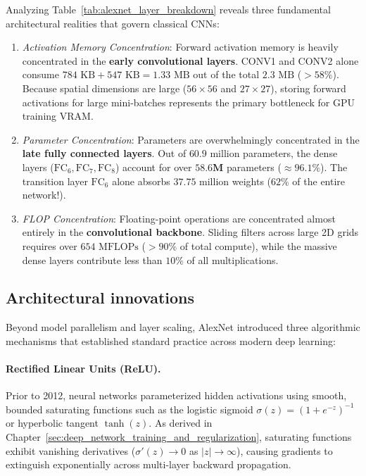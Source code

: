 Analyzing Table~\ref{tab:alexnet_layer_breakdown} reveals three fundamental architectural realities that govern classical CNNs:
\begin{enumerate}[leftmargin=*]
  \item \textit{Activation Memory Concentration}: Forward activation memory is heavily concentrated in the \textbf{early convolutional layers}. CONV1 and CONV2 alone consume $784\text{ KB} + 547\text{ KB} = 1.33\text{ MB}$ out of the total $2.3\text{ MB}$ ($>58\%$). Because spatial dimensions are large ($56 \times 56$ and $27 \times 27$), storing forward activations for large mini-batches represents the primary bottleneck for GPU training VRAM.
  \item \textit{Parameter Concentration}: Parameters are overwhelmingly concentrated in the \textbf{late fully connected layers}. Out of $60.9$ million parameters, the dense layers ($\text{FC}_6, \text{FC}_7, \text{FC}_8$) account for over $\mathbf{58.6\text{M}}$ parameters ($\approx \mathbf{96.1\%}$). The transition layer $\text{FC}_6$ alone absorbs $37.75$ million weights ($62\%$ of the entire network!).
  \item \textit{FLOP Concentration}: Floating-point operations are concentrated almost entirely in the \textbf{convolutional backbone}. Sliding filters across large 2D grids requires over $654\text{ MFLOPs}$ ($>90\%$ of total compute), while the massive dense layers contribute less than $10\%$ of all multiplications.
\end{enumerate}

\subsection{Architectural innovations}
\label{sec:alexnet_innovations}

Beyond model parallelism and layer scaling, AlexNet introduced three algorithmic mechanisms that established standard practice across modern deep learning:

\paragraph{Rectified Linear Units (ReLU).}
Prior to 2012, neural networks parameterized hidden activations using smooth, bounded saturating functions such as the logistic sigmoid $\sigma(z) = (1 + e^{-z})^{-1}$ or hyperbolic tangent $\tanh(z)$. As derived in Chapter~\ref{sec:deep_network_training_and_regularization}, saturating functions exhibit vanishing derivatives ($\sigma'(z) \to 0$ as $|z| \to \infty$), causing gradients to extinguish exponentially across multi-layer backward propagation.

